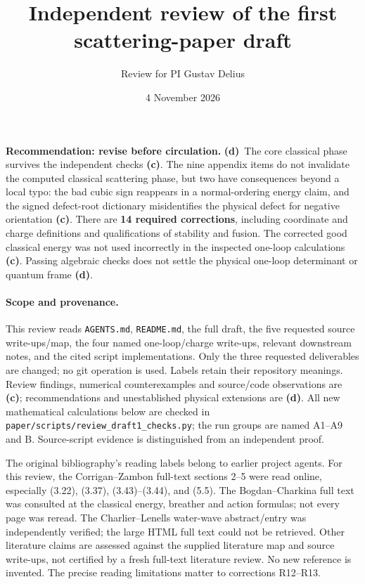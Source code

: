 \documentclass[11pt,a4paper]{article}
\title{Independent review of the first scattering-paper draft}
\author{Review for PI Gustav Delius}
\date{4 November 2026}
\newcommand{\C}{\textsf{\textbf{(c)}}}
\newcommand{\D}{\textsf{\textbf{(d)}}}
\newcommand{\file}[1]{\nolinkurl{#1}}
\newcommand{\ours}{\file{paper/scripts/review_draft1_checks.py}}
\begin{document}
\maketitle

\noindent\textbf{Recommendation: revise before circulation.} \D\
The core classical phase survives the independent checks \C.
The nine appendix items do not invalidate the computed classical scattering
phase, but two have consequences beyond a local typo: the bad cubic sign
reappears in a normal-ordering energy claim, and the signed defect-root
dictionary misidentifies the physical defect for negative orientation \C.
There are \textbf{14 required corrections}, including coordinate and charge
definitions and qualifications of stability and fusion. The corrected good
classical energy was not used incorrectly in the inspected one-loop
calculations \C. Passing algebraic checks does not settle the physical
one-loop determinant or quantum frame \D.

\paragraph{Scope and provenance.}
This review reads \file{AGENTS.md}, \file{README.md}, the full draft,
the five requested source write-ups/map, the four named one-loop/charge
write-ups, relevant downstream notes, and the cited script implementations.
Only the three requested deliverables are changed; no git operation is used.
Labels retain their repository meanings. Review findings, numerical
counterexamples and source/code observations are \C; recommendations and
unestablished physical extensions are \D. All new mathematical calculations
below are checked in \ours; the run groups are named A1--A9 and B.
Source-script evidence is distinguished from an independent proof.

The original bibliography's reading labels belong to earlier project agents.
For this review, the Corrigan--Zambon full-text sections 2--5 were read online,
especially (3.22), (3.37), (3.43)--(3.44), and (5.5).
The Bogdan--Charkina full text was consulted at the classical energy,
breather and action formulas; not every page was reread. The
Charlier--Lenells water-wave abstract/entry was independently verified;
the large HTML full text could not be retrieved. Other literature claims
are assessed against the supplied literature map and source write-ups,
not certified by a fresh full-text literature review. No new reference is
invented. The precise reading limitations matter to corrections R12--R13.
\end{document}
